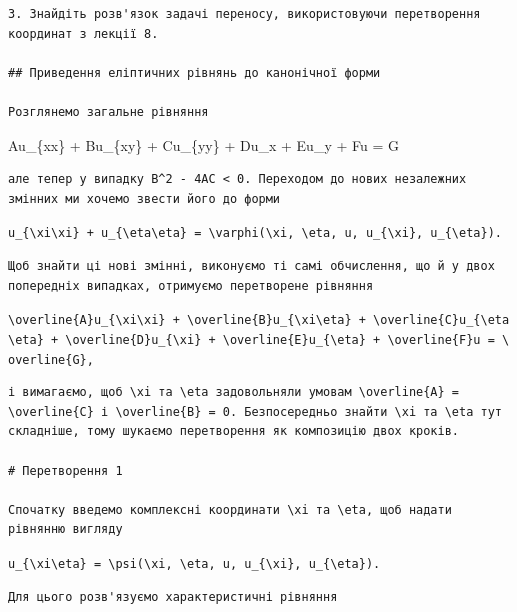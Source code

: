 \documentclass[
  ukrainian,
]{article}
\begin{document}
\begin{verbatim}
3. Знайдіть розв'язок задачі переносу, використовуючи перетворення координат з лекції 8.

## Приведення еліптичних рівнянь до канонічної форми

Розглянемо загальне рівняння
\end{verbatim}

Au\_\{xx\} + Bu\_\{xy\} + Cu\_\{yy\} + Du\_x + Eu\_y + Fu = G

\begin{verbatim}
але тепер у випадку B^2 - 4AC < 0. Переходом до нових незалежних змінних ми хочемо звести його до форми
\end{verbatim}

\texttt{u\_\{\textbackslash{}xi\textbackslash{}xi\}\ +\ u\_\{\textbackslash{}eta\textbackslash{}eta\}\ =\ \textbackslash{}varphi(\textbackslash{}xi,\ \textbackslash{}eta,\ u,\ u\_\{\textbackslash{}xi\},\ u\_\{\textbackslash{}eta\}).}

\begin{verbatim}
Щоб знайти ці нові змінні, виконуємо ті самі обчислення, що й у двох попередніх випадках, отримуємо перетворене рівняння
\end{verbatim}

\texttt{\textbackslash{}overline\{A\}u\_\{\textbackslash{}xi\textbackslash{}xi\}\ +\ \textbackslash{}overline\{B\}u\_\{\textbackslash{}xi\textbackslash{}eta\}\ +\ \textbackslash{}overline\{C\}u\_\{\textbackslash{}eta\textbackslash{}eta\}\ +\ \textbackslash{}overline\{D\}u\_\{\textbackslash{}xi\}\ +\ \textbackslash{}overline\{E\}u\_\{\textbackslash{}eta\}\ +\ \textbackslash{}overline\{F\}u\ =\ \textbackslash{}overline\{G\},}

\begin{verbatim}
і вимагаємо, щоб \xi та \eta задовольняли умовам \overline{A} = \overline{C} і \overline{B} = 0. Безпосередньо знайти \xi та \eta тут складніше, тому шукаємо перетворення як композицію двох кроків.

# Перетворення 1

Спочатку введемо комплексні координати \xi та \eta, щоб надати рівнянню вигляду
\end{verbatim}

\texttt{u\_\{\textbackslash{}xi\textbackslash{}eta\}\ =\ \textbackslash{}psi(\textbackslash{}xi,\ \textbackslash{}eta,\ u,\ u\_\{\textbackslash{}xi\},\ u\_\{\textbackslash{}eta\}).}

\begin{verbatim}
Для цього розв'язуємо характеристичні рівняння
\end{verbatim}
\end{document}
